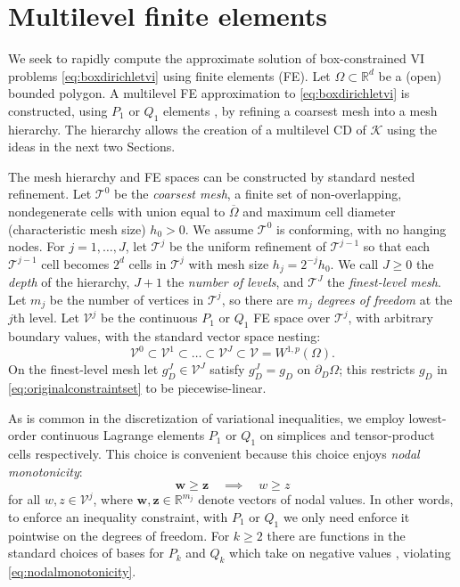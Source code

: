 \documentclass[letterpaper,final,12pt,reqno]{amsart}
\theoremstyle{cstyle}
\theoremstyle{cstyle*}
\theoremstyle{dstyle}
\numberwithin{equation}{section}
\numberwithin{figure}{section}
\numberwithin{table}{section}
\numberwithin{theorem}{section}
\newcommand{\RR}{\mathbb{R}}
\newcommand{\bw}{\mathbf{w}}
\newcommand{\bz}{\mathbf{z}}
\newcommand{\cK}{\mathcal{K}}
\begin{document}
\section{Multilevel finite elements} \label{sec:femultilevel}

We seek to rapidly compute the approximate solution of box-constrained VI problems \eqref{eq:boxdirichletvi} using finite elements (FE).  Let $\Omega \subset \RR^d$ be a (open) bounded polygon.  A multilevel FE approximation to \eqref{eq:boxdirichletvi} is constructed, using $P_1$ or $Q_1$ elements \cite{Elmanetal2014}, by refining a coarsest mesh into a mesh hierarchy.  The hierarchy allows the creation of a multilevel CD of $\cK$ using the ideas in the next two Sections.

The mesh hierarchy and FE spaces can be constructed by standard nested refinement.  Let $\mathcal{T}^0$ be the \emph{coarsest mesh}, a finite set of non-overlapping, nondegenerate cells with union equal to $\overline{\Omega}$ and maximum cell diameter (characteristic mesh size) $h_0>0$.  We assume $\mathcal{T}^0$ is conforming, with no hanging nodes.  For $j=1,\dots,J$, let $\mathcal{T}^j$ be the uniform refinement of $\mathcal{T}^{j-1}$ so that each $\mathcal{T}^{j-1}$ cell becomes $2^d$ cells in $\mathcal{T}^j$ with mesh size $h_j = 2^{-j} h_0$.  We call $J\ge 0$ the \emph{depth} of the hierarchy, $J+1$ the \emph{number of levels}, and $\mathcal{T}^J$ the \emph{finest-level mesh}.  Let $m_j$ be the number of vertices in $\mathcal{T}^j$, so there are $m_j$ \emph{degrees of freedom} at the $j$th level.  Let $\mathcal{V}^j$ be the continuous $P_1$ or $Q_1$ FE space over $\mathcal{T}^j$, with arbitrary boundary values, with the standard vector space nesting:
\begin{equation}
\mathcal{V}^0 \subset \mathcal{V}^1 \subset \dots \subset \mathcal{V}^J \subset \mathcal{V}=W^{1,p}(\Omega).  \label{eq:fe:nestedspaces}
\end{equation}
On the finest-level mesh let $g_D^J \in \mathcal{V}^J$ satisfy $g_D^J = g_D$ on $\partial_D \Omega$; this restricts $g_D$ in \eqref{eq:originalconstraintset} to be piecewise-linear.

As is common in the discretization of variational inequalities, we employ lowest-order continuous Lagrange elements $P_1$ or $Q_1$ on simplices and tensor-product cells respectively. This choice is convenient because this choice enjoys \emph{nodal monotonicity}:
\begin{equation}
\bw \ge \bz \quad \implies \quad w \ge z \label{eq:nodalmonotonicity}
\end{equation}
for all $w,z \in \mathcal{V}^j$, where $\bw,\bz \in \RR^{m_j}$ denote vectors of nodal values. In other words, to enforce an inequality constraint, with $P_1$ or $Q_1$ we only need enforce it pointwise on the degrees of freedom. For $k\ge 2$ there are functions in the standard choices of bases for $P_k$ and $Q_k$ which take on negative values \cite[Figure 1.7]{Elmanetal2014}, violating \eqref{eq:nodalmonotonicity}.
\end{document}
